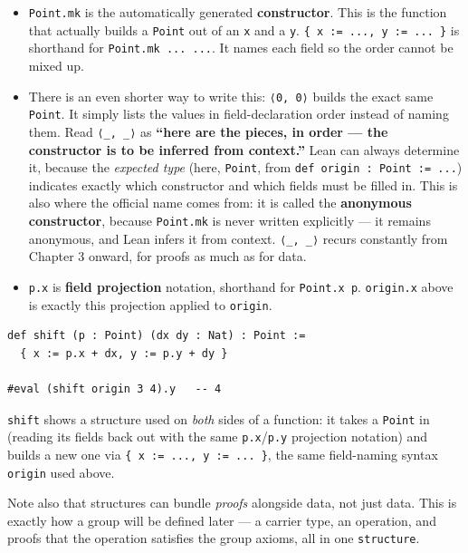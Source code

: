 \begin{itemize}
\tightlist
\item
  \texttt{Point.mk} is the automatically generated \textbf{constructor}. This is the function that actually builds a \texttt{Point} out of an \texttt{x} and a \texttt{y}. \texttt{\{ x := ..., y := ... \}} is shorthand for \texttt{Point.mk ... ...}. It names each field so the order cannot be mixed up.
\item
  There is an even shorter way to write this: \texttt{⟨0, 0⟩} builds the exact same \texttt{Point}. It simply lists the values in field-declaration order instead of naming them. Read \texttt{⟨\_\allowbreak{}, \_\allowbreak{}⟩} as \textbf{``here are the pieces, in order --- the constructor is to be inferred from context.''} Lean can always determine it, because the \emph{expected type} (here, \texttt{Point}, from \texttt{def origin : Point := ...}) indicates exactly which constructor and which fields must be filled in. This is also where the official name comes from: it is called the \textbf{anonymous constructor}, because \texttt{Point.mk} is never written explicitly --- it remains anonymous, and Lean infers it from context. \texttt{⟨\_\allowbreak{}, \_\allowbreak{}⟩} recurs constantly from Chapter 3 onward, for proofs as much as for data.
\item
  \texttt{p.x} is \textbf{field projection} notation, shorthand for \texttt{Point.x p}. \texttt{origin.x} above is exactly this projection applied to \texttt{origin}.
\end{itemize}

\begin{lstlisting}
def shift (p : Point) (dx dy : Nat) : Point :=
  { x := p.x + dx, y := p.y + dy }

#eval (shift origin 3 4).y   -- 4
\end{lstlisting}

\texttt{shift} shows a structure used on \emph{both} sides of a function: it takes a \texttt{Point} in (reading its fields back out with the same \texttt{p.x}/\texttt{p.y} projection notation) and builds a new one via \texttt{\{ x := ..., y := ... \}}, the same field-naming syntax \texttt{origin} used above.

Note also that structures can bundle \emph{proofs} alongside data, not just data. This is exactly how a group will be defined later --- a carrier type, an operation, and proofs that the operation satisfies the group axioms, all in one \texttt{structure}.

